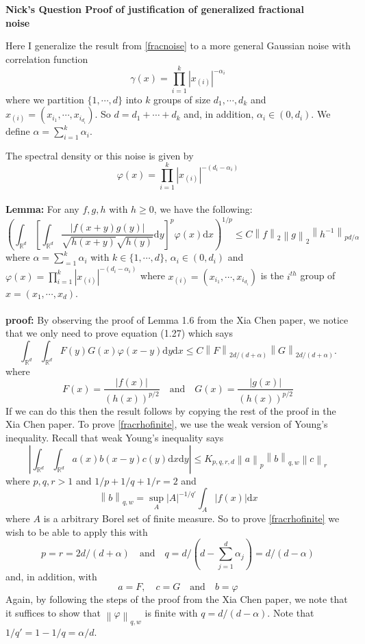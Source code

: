 \documentclass[a4paper,11pt]{article}
\numberwithin{equation}{section}
\theoremstyle{plain}
\theoremstyle{definition}
\newcommand{\ud}{\ensuremath{\mathrm{d} }}
\newcommand{\Norm}[1]{\left\|  #1   \right\|}
\newcommand{\R}{\mathbb{R}}
\newcounter{NQ}
\newenvironment{NickQuestion}[1][] %
{\refstepcounter{NQ}
	\begin{mdframed}[backgroundcolor=lightgray]\textbf{Nick's Question \theNQ \: #1~~}~~~\noindent}%
	{\end{mdframed}}
\numberwithin{NQ}{section}
\numberwithin{LQ}{section}
\numberwithin{ZQ}{section}
\begin{document}
	\begin{NickQuestion}[Proof of justification of generalized fractional noise]

Here I generalize the result from \ref{fracnoise} to a more general Gaussian noise with correlation function
	\[
		\gamma(x) = \prod_{i=1}^k |x_{(i)}|^{-\alpha_i}
	\]
where we partition $\{1,\cdots,d\}$ into $k$ groups of size $d_1, \cdots, d_k$ and $x_{(i)} = (x_{i_1},\cdots, x_{i_{d_i}})$. So $d = d_1 + \cdots + d_k$ and, in addition, $\alpha_i \in (0,d_i)$. We define $\alpha = \sum_{i=1}^k \alpha_i$.

The spectral density or this noise is given by
	\[
		\varphi(x) = \prod_{i=1}^k |x_{(i)}|^{-(d_i-\alpha_i)}
	\]
		\\
\textbf{Lemma:} For any $f,g,h$ with $h\ge0$, we have the following:
	\[
		\left( \int_{\R^d} \left[ \int_{\R^d} \dfrac{|f(x+y)g(y)|}{\sqrt{h(x+y)}\sqrt{h(y)}} \ud y \right]^p \varphi(x) \ud x \right)^{1/p} \le C \Norm{f}_2 \Norm{g}_2 \Norm{h^{-1}}_{pd/\alpha}
	\]
where $\alpha = \sum_{=1}^k \alpha_i$ with $k \in \{1, \cdots ,d\}$, $\alpha_i \in (0,d_i)$ and $\varphi(x) = \prod_{i =1}^k |x_{(i)}|^{-(d_i-\alpha_i)}$ where $x_{(i)} = (x_{i_1},\cdots , x_{i_{d_i}} )$ is the $i^{th}$ group of $x=(x_1, \cdots, x_d)$.
\\ \\
\textbf{proof:} By observing the proof of Lemma 1.6 from the Xia Chen paper, we notice that we only need to prove equation (1.27) which says
	\begin{equation}\label{fracrhofinite}
		\int_{\R^d}\int_{\R^d} F(y)G(x)\varphi(x-y) \ud y \ud x \le C \Norm{F}_{2d/(d+\alpha)} \Norm{G}_{2d/(d+ \alpha)}.
		\end{equation}
	where
		\[
		F(x) = \frac{|f(x)|}{(h(x))^{p/2}} \quad \text{and} \quad G(x) = \frac{|g(x)|}{(h(x))^{p/2}}
		\]
		If we can do this then the result follows by copying the rest of the proof in the Xia Chen paper. To prove \ref{fracrhofinite}, we use the weak version of Young's inequality. Recall that weak Young's inequality says
		\[
		\left|	\int_{\R^d}\int_{\R^d}a(x)b(x-y)c(y) \ud x \ud y \right| \le K_{p,q,r,d} \Norm{a}_p\Norm{b}_{q,w}\Norm{c}_r
		\]
		where $p,q,r >1$ and $1/p + 1/q + 1/r =2$ and
		\[
		\Norm{b}_{q,w} = \sup_{A} |A|^{-1/q'} \int_A |f(x)| \ud x
		\]
		where $A$ is a arbitrary Borel set of finite measure. So to prove \ref{fracrhofinite} we wish to be able to apply this with
		\[
		p=r=2d/(d+\alpha) \quad \text{and} \quad q= d/\left(d-\sum_{j=1}^d\alpha_j \right) = d/(d-\alpha)
		\]
		and, in addition, with
		\[
		a=F, \quad c=G \quad \text{and} \quad b=\varphi
		\]
		Again, by following the steps of the proof from the Xia Chen paper, we note that it suffices to show that $\Norm{\varphi}_{q,w}$ is finite with $q = d/(d-\alpha)$. Note that $1/q' = 1 - 1/q = \alpha/d.$


\end{NickQuestion}
\end{document}
